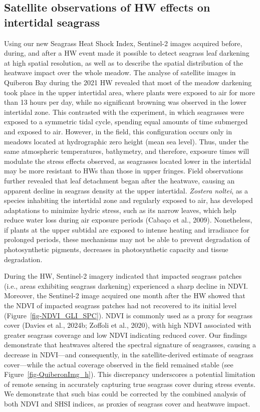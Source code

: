 \documentclass[
  letterpaper,
  11pt,
  english,
  singlespacing,
  headsepline]{MastersDoctoralThesis}
\begin{document}
\begin{spacing}{1.5}
\subsection{Satellite observations of HW effects on intertidal
seagrass}\label{satellite-observations-of-hw-effects-on-intertidal-seagrass}

Using our new Seagrass Heat Shock Index, Sentinel-2 images acquired
before, during, and after a HW event made it possible to detect seagrass
leaf darkening at high spatial resolution, as well as to describe the
spatial distribution of the heatwave impact over the whole meadow. The
analyse of satellite images in Quiberon Bay during the 2021 HW revealed
that most of the meadow darkening took place in the upper intertidal
area, where plants were exposed to air for more than 13 hours per day,
while no significant browning was observed in the lower intertidal zone.
This contrasted with the experiment, in which seagrasses were exposed to
a symmetric tidal cycle, spending equal amounts of time submerged and
exposed to air. However, in the field, this configuration occurs only in
meadows located at hydrographic zero height (mean sea level). Thus,
under the same atmospheric temperatures, bathymetry, and therefore,
exposure times will modulate the stress effects observed, as seagrasses
located lower in the intertidal may be more resistant to HWs than those
in upper fringes. Field observations further revealed that leaf
detachment began after the heatwave, causing an apparent decline in
seagrass density at the upper intertidal. \emph{Zostera noltei}, as a
species inhabiting the intertidal zone and regularly exposed to air, has
developed adaptations to minimize hydric stress, such as its narrow
leaves, which help reduce water loss during air exposure periods (Cabaço
et al., 2009). Nonetheless, if plants at the upper subtidal are exposed
to intense heating and irradiance for prolonged periods, these
mechanisms may not be able to prevent degradation of photosynthetic
pigments, decreases in photosynthetic capacity and tissue degradation.

During the HW, Sentinel-2 imagery indicated that impacted seagrass
patches (i.e., areas exhibiting seagrass darkening) experienced a sharp
decline in NDVI. Moreover, the Sentinel-2 image acquired one month after
the HW showed that the NDVI of impacted seagrass patches had not
recovered to its initial level (Figure~\ref{fig-NDVI_GLI_SPC}). NDVI is
commonly used as a proxy for seagrass cover (Davies et al., 2024b;
Zoffoli et al., 2020), with high NDVI associated with greater seagrass
coverage and low NDVI indicating reduced cover. Our findings demonstrate
that heatwaves altered the spectral signature of seagrasses, causing a
decrease in NDVI---and consequently, in the satellite-derived estimate
of seagrass cover---while the actual coverage observed in the field
remained stable (see Figure~\ref{fig-QuiberonImg_h}). This discrepancy
underscores a potential limitation of remote sensing in accurately
capturing true seagrass cover during stress events. We demonstrate that
such bias could be corrected by the combined analysis of both NDVI and
SHSI indices, as proxies of seagrass cover and heatwave impact.


\end{spacing}
\end{document}
